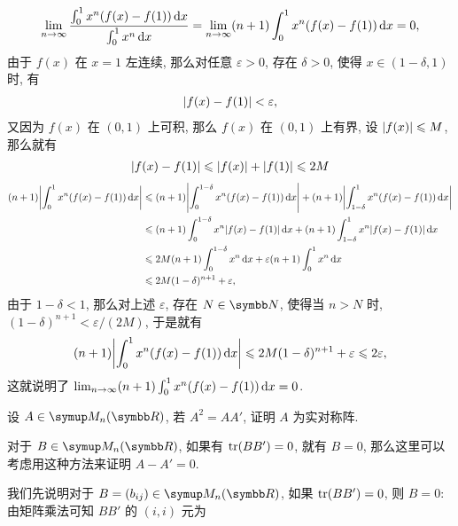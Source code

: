 \begin{exercise}[series=exer]
\begin{answer}
\begin{align*}
            \lim_{n \to \infty} \frac{\int_{0}^{1} x^{n} (f(x) - f(1)) \dd{x}}{\int_{0}^{1} x^{n} \dd{x}} = \lim_{n \to \infty} (n + 1) \int_{0}^{1} x^{n} (f(x) - f(1)) \dd{x} = 0,
        \end{align*}
        由于 $ f(x) $ 在 $ x = 1 $ 左连续, 那么对任意 $ \varepsilon > 0 $, 存在 $ \delta > 0 $, 使得 $ x \in (1 - \delta, 1) $ 时, 有
        \begin{align*}
            \abs{f(x) - f(1)} < \varepsilon,
        \end{align*}
        又因为 $ f(x) $ 在 $ (0, 1) $ 上可积, 那么 $ f(x) $ 在 $ (0, 1) $ 上有界, 设 $ \abs{f(x)} \leqslant M $, 那么就有
        \begin{align*}
            \abs{f(x) - f(1)} \leqslant \abs{f(x)} + \abs{f(1)} \leqslant 2M
        \end{align*}
        \begin{align*}
            (n + 1) \abs{\int_{0}^{1} x^{n} (f(x) - f(1)) \dd{x}} & \leqslant (n + 1) \abs{\int_{0}^{1 - \delta} x^{n} (f(x) - f(1)) \dd{x}} + (n + 1) \abs{\int_{1 - \delta}^{1} x^{n} (f(x) - f(1)) \dd{x}}\\
            & \leqslant (n + 1) \int_{0}^{1 - \delta} x^{n} \abs{f(x) - f(1)} \dd{x} + (n + 1) \int_{1 - \delta}^{1} x^{n} \abs{f(x) - f(1)} \dd{x}\\
            & \leqslant 2M(n + 1)\int_{0}^{1 - \delta} x^{n} \dd{x} + \varepsilon (n + 1) \int_{0}^{1} x^{n} \dd{x}\\
            & \leqslant 2M(1 - \delta)^{n + 1} + \varepsilon,
        \end{align*}
        由于 $ 1 - \delta < 1 $, 那么对上述 $ \varepsilon $, 存在 $ N \in \N $, 使得当 $ n > N $ 时, $ (1 - \delta)^{n + 1} < \varepsilon/(2M) $, 于是就有
        \begin{align*}
            (n + 1) \abs{\int_{0}^{1} x^{n} (f(x) - f(1)) \dd{x}} \leqslant 2M(1 - \delta)^{n + 1} + \varepsilon \leqslant 2\varepsilon,
        \end{align*}
        这就说明了 $ \lim_{n \to \infty} (n + 1) \int_{0}^{1} x^{n} (f(x) - f(1)) \dd{x} = 0 $.
    \end{answer}
    \item\label{item:A2=AA'} 设 $ A \in \MM $, 若 $ A^{2} = AA' $, 证明 $ A $ 为实对称阵.
    \begin{hint}
        对于 $ B \in \MM $, 如果有 $ \tr(BB') = 0 $, 就有 $ B = 0 $, 那么这里可以考虑用这种方法来证明 $ A - A' = 0 $. 
    \end{hint}
    \begin{answer}
        我们先说明对于 $ B = (b_{ij}) \in \MM $, 如果 $ \tr(BB') = 0 $, 则 $ B = 0 $: 由矩阵乘法可知 $ BB' $ 的 $ (i, i) $ 元为

\end{answer}
\end{exercise}
